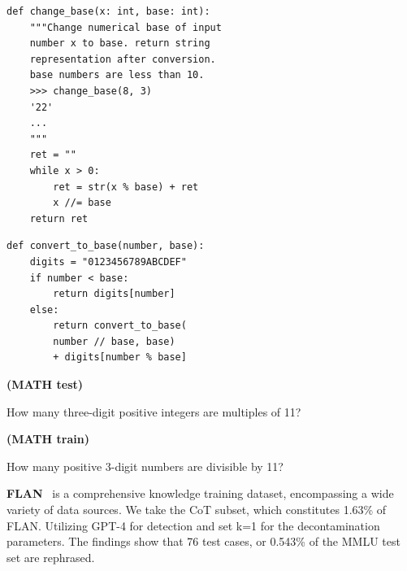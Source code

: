 \begin{example}[RedPajama]\label{def:redpajama-example}
\begin{tcolorbox}[title={HumanEval test}, enhanced, colback=white, boxrule=1pt, sharp corners, boxsep=5pt, left=5pt, right=5pt, top=5pt, bottom=5pt]
\fontsize{8pt}{8pt}\selectfont
\begin{verbatim}
def change_base(x: int, base: int):
    """Change numerical base of input
    number x to base. return string
    representation after conversion.
    base numbers are less than 10.
    >>> change_base(8, 3)
    '22'
    ...
    """
    ret = ""
    while x > 0:
        ret = str(x % base) + ret
        x //= base
    return ret
\end{verbatim}
\end{tcolorbox}


\begin{tcolorbox}[title={RedPajama}, enhanced, colback=white, boxrule=1pt, sharp corners, boxsep=5pt, left=5pt, right=5pt, top=5pt, bottom=5pt]
\fontsize{8pt}{8pt}\selectfont
\begin{verbatim}
def convert_to_base(number, base):
    digits = "0123456789ABCDEF"
    if number < base:
        return digits[number]
    else:
        return convert_to_base(
        number // base, base) 
        + digits[number % base]
\end{verbatim}
\end{tcolorbox}

\end{example}







\begin{example}\label{def:math-example}
\textbf{(MATH test)}

How many three-digit positive integers are multiples of 11?

\textbf{(MATH train)}

How many positive 3-digit numbers are divisible by 11?
\end{example}

\textbf{FLAN}~\citep{longpre2023flan} is a comprehensive knowledge training dataset, encompassing a wide variety of data sources. We take the CoT subset, which constitutes 1.63\% of FLAN. Utilizing GPT-4 for detection and set k=1 for the decontamination parameters. The findings show that 76 test cases, or 0.543\% of the MMLU test set are rephrased. 

